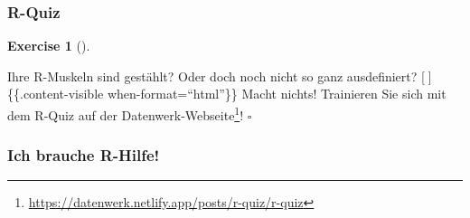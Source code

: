 \documentclass[
  letterpaper,
  DIV=11,
  numbers=noendperiod]{scrartcl}
\theoremstyle{definition}
\newtheorem{exercise}{Exercise}[section]
\theoremstyle{definition}
\theoremstyle{definition}
\theoremstyle{remark}
\begin{document}
\subsubsection{R-Quiz}\label{r-quiz}

\begin{exercise}[]\protect\hypertarget{exr-rquiz}{}\label{exr-rquiz}

Ihre R-Muskeln sind gestählt? Oder doch noch nicht so ganz ausdefiniert?
{[}😤{]}\{\{.content-visible when-format=``html''\}\} Macht nichts!
Trainieren Sie sich mit dem R-Quiz auf der
Datenwerk-Webseite\footnote{\url{https://datenwerk.netlify.app/posts/r-quiz/r-quiz}}!
\(\square\)

\end{exercise}

\subsubsection{Ich brauche R-Hilfe!}\label{r-faq}
\end{document}
